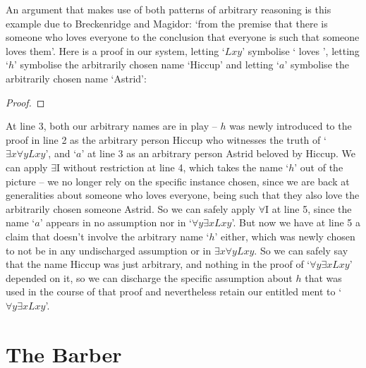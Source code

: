 An argument that makes use of both patterns of arbitrary reasoning is this example due to Breckenridge and Magidor: `from the premise that there is someone who loves everyone to the conclusion that everyone is such that someone loves them'. Here is a proof in our system, letting `$Lxy$' symbolise ` loves ', letting `$h$' symbolise the arbitrarily chosen name `Hiccup' and letting `$a$' symbolise the arbitrarily chosen name `Astrid': \begin{proof}
	\open
	\close
\end{proof} At line 3, both our arbitrary names are in play – $h$ was newly introduced to the proof in line 2 as the arbitrary person Hiccup who witnesses the truth of `$\exists x \forall y Lxy$', and `$a$' at line 3 as an arbitrary person Astrid beloved by Hiccup. We can apply $\exists$I without restriction at line 4, which takes the name `$h$' out of the picture – we no longer rely on the specific instance chosen, since we are back at generalities about someone who loves everyone, being such that they also love the arbitrarily chosen someone Astrid. So we can safely apply $\forall$I at line 5, since the name `$a$' appears in no assumption nor in `$\forall y\exists x Lxy$'. But now we have at line 5 a claim that doesn't involve the arbitrary name `$h$' either, which was newly chosen to not be in any undischarged assumption or in $\exists x \forall y Lxy$. So we can safely say that the name Hiccup was just arbitrary, and nothing in the proof of `$\forall y\exists x Lxy$' depended on it, so we can discharge the specific assumption about $h$ that was used in the course of that proof and nevertheless retain our entitled ment to `$\forall y\exists x Lxy$'. 

\section{The Barber}\label{barber}

